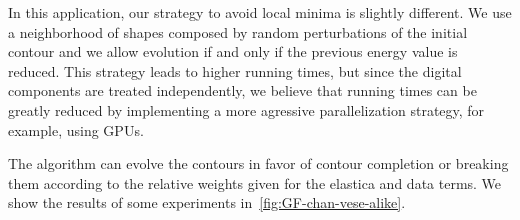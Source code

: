 \documentclass[review]{siamart220329}
\begin{document}
In this application, our strategy to avoid local minima is slightly different. We use a neighborhood of shapes composed by random perturbations of the initial contour and we allow evolution if and only if the previous energy value is reduced. This strategy leads to higher running times, but since the digital components are treated independently, we believe that running times can be greatly reduced by implementing a more agressive parallelization strategy, for example, using GPUs. 

The algorithm can evolve the contours in favor of contour completion or breaking them according to the relative weights given for the elastica and data terms. We show the results of some experiments in~\cref{fig:GF-chan-vese-alike}.

\begin{figure}
\center
{}
\end{figure}
\end{document}
